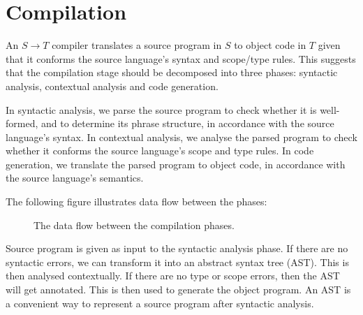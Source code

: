 \documentclass[a4paper, openany]{memoir}
\begin{document}
\newpage

\section{Compilation}
An $S \to T$ compiler translates a source program in $S$ to object code in $T$ given that it conforms the source language's syntax and scope/type rules. This suggests that the compilation stage should be decomposed into three phases: syntactic analysis, contextual analysis and code generation. 

In syntactic analysis, we parse the source program to check whether it is well-formed, and to determine its phrase structure, in accordance with the source language's syntax. In contextual analysis, we analyse the parsed program to check whether it conforms the source language's scope and type rules. In code generation, we translate the parsed program to object code, in accordance with the source language's semantics.

The following figure illustrates data flow between the phases:
\begin{figure}[H]
    \centering
    \caption{The data flow between the compilation phases.}
\end{figure}
\noindent Source program is given as input to the syntactic analysis phase. If there are no syntactic errors, we can transform it into an abstract syntax tree (AST). This is then analysed contextually. If there are no type or scope errors, then the AST will get annotated. This is then used to generate the object program. An AST is a convenient way to represent a source program after syntactic analysis.
\end{document}
